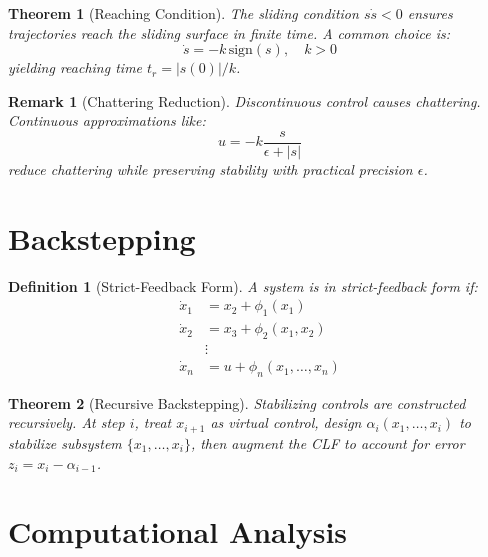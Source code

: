 \documentclass[a4paper, 11pt]{article}
\newtheorem{definition}{Definition}[section]
\newtheorem{theorem}{Theorem}[section]
\newtheorem{remark}{Remark}[section]
\begin{document}
\begin{theorem}[Reaching Condition]
The sliding condition $s \dot{s} < 0$ ensures trajectories reach the sliding surface in finite time.
A common choice is:
\begin{equation}
\dot{s} = -k \, \text{sign}(s), \quad k > 0
\end{equation}
yielding reaching time $t_r = |s(0)| / k$.
\end{theorem}

\begin{remark}[Chattering Reduction]
Discontinuous control causes chattering. Continuous approximations like:
\begin{equation}
u = -k \frac{s}{\epsilon + |s|}
\end{equation}
reduce chattering while preserving stability with practical precision $\epsilon$.
\end{remark}

\section{Backstepping}

\begin{definition}[Strict-Feedback Form]
A system is in strict-feedback form if:
\begin{align}
\dot{x}_1 &= x_2 + \phi_1(x_1) \\
\dot{x}_2 &= x_3 + \phi_2(x_1, x_2) \\
&\vdots \\
\dot{x}_n &= u + \phi_n(x_1, \ldots, x_n)
\end{align}
\end{definition}

\begin{theorem}[Recursive Backstepping]
Stabilizing controls are constructed recursively. At step $i$, treat $x_{i+1}$ as virtual control,
design $\alpha_i(x_1, \ldots, x_i)$ to stabilize subsystem $\{x_1, \ldots, x_i\}$, then augment
the CLF to account for error $z_i = x_i - \alpha_{i-1}$.
\end{theorem}

\section{Computational Analysis}
\end{document}
